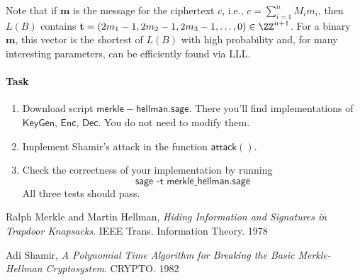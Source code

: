 \documentclass[11pt]{exam}
\theoremstyle{definition}
\let\vec\mathbf
\begin{document}
Note that if $\vec m$ is the message for the ciphertext $c$, i.e., $c =\sum_{i=1}^n M_i m_i $, then $L(B)$ contains $\vec t = (2m_1 -1, 2m_2-1, 2m_3 - 1, \ldots, 0) \in \ZZ^{n+1}$. For a binary $\vec m$, this vector is the shortest of $L(B)$ with high probability and, for many interesting parameters, can be efficiently found via LLL.

\medskip 
\paragraph{Task}

\begin{enumerate}
	\item Download script $\mathsf{merkle-hellman.sage}$. There you'll find implementations of $\mathsf{KeyGen}$,   $\mathsf{Enc}$, $ \mathsf{Dec}$. You do not need to modify them.
	\item Implement Shamir's attack in the function $\mathsf{attack()}$.
	\item Check the correctness of your implementation by running
	\[
		\textsf{sage -t merkle\_hellman.sage}
	\]
	All three tests should pass.
\end{enumerate}


\begin{thebibliography}{9}
	 Ralph Merkle and Martin Hellman,
	\textit{Hiding Information and Signatures in Trapdoor Knapsacks}. IEEE Trans. Information Theory. 1978
	
	 Adi Shamir, 
	\textit{A Polynomial Time Algorithm for Breaking the Basic Merkle-Hellman Cryptosystem}. CRYPTO. 1982
	
\end{thebibliography}
\end{document}
